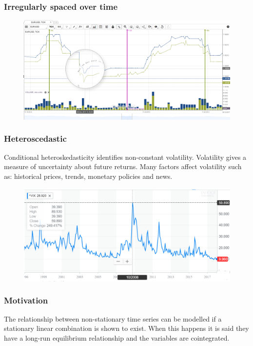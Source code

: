 \documentclass{beamer}
\begin{document}
\begin{frame}
\frametitle{Irregularly spaced over time}
\begin{figure}
\includegraphics[width=\paperwidth]{img/hft-ticks-zoom.png}
\end{figure}
\end{frame}

\begin{frame}
\frametitle{Heteroscedastic}
Conditional heteroskedasticity identifies non-constant volatility.
Volatility gives a measure of uncertainty about future returns. Many factors affect volatility such as: historical prices, trends, monetary policies and news.
\begin{figure}
\includegraphics[width=0.8\paperwidth]{img/vix}
\end{figure}
\end{frame}


\begin{frame}
\frametitle{Motivation}

The relationship between non-stationary time series can be modelled if a stationary linear combination is shown to exist.
When this happens it is said they have a long-run
equilibrium relationship and the variables are {\color{red} cointegrated}.
\end{frame}
\end{document}
